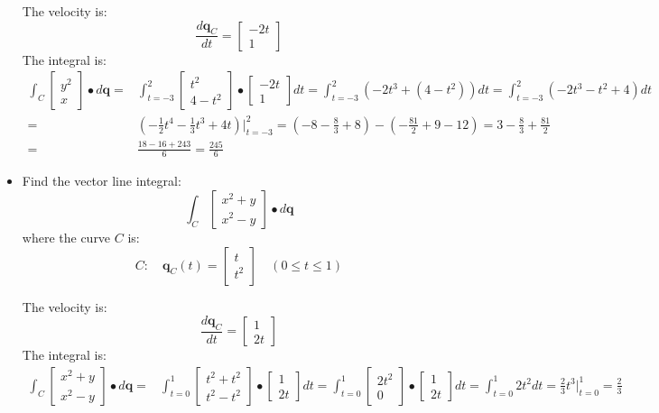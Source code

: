 \documentclass{article}
\begin{document}
\begin{itemize}
The velocity is:
\[\frac{d\mathbf{q}_C}{dt} = \begin{bmatrix} -2t \\ 1 \end{bmatrix}\] 
The integral is:
\begin{align*}
\int_C \begin{bmatrix} y^2 \\ x \end{bmatrix} \bullet d\mathbf{q} = & \int_{t = -3}^2 \begin{bmatrix} t^2 \\ 4 - t^2 \end{bmatrix} \bullet \begin{bmatrix} -2t \\ 1 \end{bmatrix} dt 
= \int_{t = -3}^2 (-2t^3 + (4 - t^2))dt 
= \int_{t = -3}^2 (-2t^3 - t^2 + 4)dt \\   
= & (-\frac{1}{2}t^4 - \frac{1}{3}t^3 + 4t)\Big|_{t = -3}^2 
= (-8 - \frac{8}{3} + 8) - (-\frac{81}{2} + 9 - 12) 
= 3 - \frac{8}{3} + \frac{81}{2} \\ 
= & \frac{18 - 16 + 243}{6} 
= \frac{245}{6}
\end{align*}

\item
Find the vector line integral: 
\[\int_C \begin{bmatrix} x^2 + y \\ x^2 - y \end{bmatrix} \bullet d\mathbf{q}\]
where the curve \(C\) is:
\[C : \quad 
\mathbf{q}_C(t) = \begin{bmatrix} 
t \\ t^2  
\end{bmatrix} \quad 
(0 \leq t \leq 1)\]

The velocity is:
\[\frac{d\mathbf{q}_C}{dt} = \begin{bmatrix} 1 \\ 2t \end{bmatrix}\]
The integral is:
\begin{align*}
\int_C \begin{bmatrix} x^2 + y \\ x^2 - y \end{bmatrix} \bullet d\mathbf{q} 
= & \int_{t=0}^1 \begin{bmatrix} t^2 + t^2 \\ t^2 - t^2 \end{bmatrix} \bullet \begin{bmatrix} 1 \\ 2t \end{bmatrix} dt   
= \int_{t=0}^1 \begin{bmatrix} 2t^2 \\ 0 \end{bmatrix} \bullet \begin{bmatrix} 1 \\ 2t \end{bmatrix} dt   
= \int_{t=0}^1 2t^2 dt   
= \frac{2}{3}t^3\bigg|_{t=0}^1 
= \frac{2}{3}
\end{align*}


\end{itemize}
\end{document}
